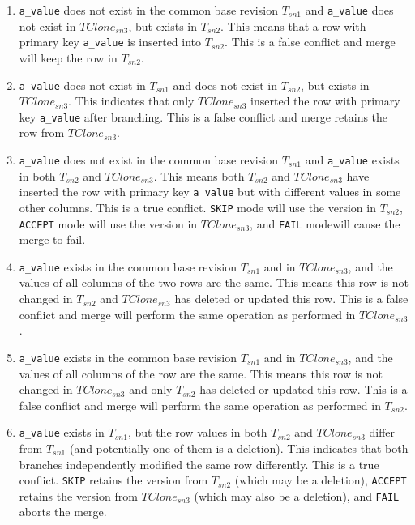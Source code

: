 \documentclass[sigconf,nonacm]{acmart} %
\begin{document}
\begin{enumerate}
\item \texttt{a\_value} does not exist in the common base revision $T_{sn1}$ 
and \texttt{a\_value} does not exist in $TClone_{sn3}$, but exists in $T_{sn2}$.
This means that a row with primary key \texttt{a\_value} is inserted into
$T_{sn2}$.  This is a false conflict and merge will keep the row in $T_{sn2}$.

\item \texttt{a\_value} does not exist in $T_{sn1}$
and does not exist in $T_{sn2}$, but exists in $TClone_{sn3}$.
This indicates that only $TClone_{sn3}$ inserted the row with primary key 
\texttt{a\_value} after branching. This is a false conflict and 
merge retains the row from $TClone_{sn3}$.

\item \texttt{a\_value} does not exist in the common base revision 
$T_{sn1}$ and \texttt{a\_value} exists in both $T_{sn2}$ and $TClone_{sn3}$.
This means both $T_{sn2}$ and $TClone_{sn3}$ have inserted the row 
with primary key \texttt{a\_value} but with different values in 
some other columns.  This is a true conflict.  
\texttt{SKIP} mode will use the version in $T_{sn2}$, 
\texttt{ACCEPT} mode will use the version in $TClone_{sn3}$,
and \texttt{FAIL} modewill cause the merge to fail.

\item \texttt{a\_value} exists in the common base revision $T_{sn1}$ 
and in $TClone_{sn3}$, and the values of all columns of the two rows
are the same.  This means this row is not changed in $T_{sn2}$ and 
$TClone_{sn3}$ has deleted or updated this row.  This is a false 
conflict and merge will perform the same operation as performed 
in $TClone_{sn3}$.

\item \texttt{a\_value} exists in the common base revision $T_{sn1}$ 
and in $TClone_{sn3}$, and the values of all columns of the row 
are the same. This means this row is not changed in $TClone_{sn3}$
and only $T_{sn2}$ has deleted or updated this row. 
This is a false conflict and merge will perform the 
same operation as performed in $T_{sn2}$.

\item \texttt{a\_value} exists in $T_{sn1}$,
but the row values in both $T_{sn2}$ and $TClone_{sn3}$ differ from $T_{sn1}$ 
(and potentially one of them is a deletion). This indicates that both branches 
independently modified the same row differently. This is a true conflict. 
\texttt{SKIP} retains the version 
from $T_{sn2}$ (which may be a deletion), \texttt{ACCEPT} retains the version from 
$TClone_{sn3}$ (which may also be a deletion), and \texttt{FAIL} aborts the merge.
\end{enumerate}
\end{document}
